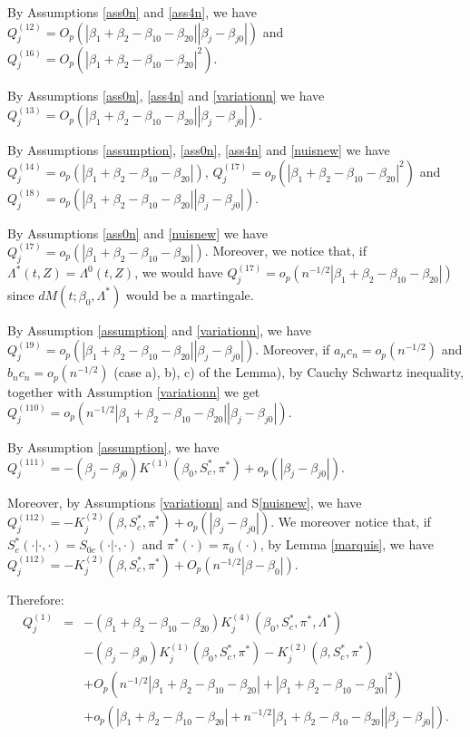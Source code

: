 \documentclass[11pt]{article}
\newcommand{\eqnn}{\begin{eqnarray*}}
\newcommand{\een}{\end{eqnarray*}}
\begin{document}
\begin{newproof7}
By Assumptions \ref{ass0n} and \ref{ass4n}, we have $Q^{(12)}_j=O_p\left(\left|\beta_1+\beta_2-\beta_{10}-\beta_{20}\right|\left|\beta_j-\beta_{j0}\right|\right)$ and $Q^{(16)}_j=O_p\left(\left|\beta_1+\beta_2-\beta_{10}-\beta_{20}\right|^2\right)$.

By Assumptions \ref{ass0n}, \ref{ass4n} and \ref{variationn} we have $Q^{(13)}_j=O_p\left(\left|\beta_1+\beta_2-\beta_{10}-\beta_{20}\right|\left|\beta_j-\beta_{j0}\right|\right)$.

By Assumptions \ref{assumption}, \ref{ass0n}, \ref{ass4n}  and  \eqref{nuisnew} we have $Q^{(14)}_j=o_p(\left|\beta_1+\beta_2-\beta_{10}-\beta_{20}\right|)$, $Q^{(17)}_j=o_p\left(\left|\beta_1+\beta_2-\beta_{10}-\beta_{20}\right|^2\right)$ and $Q^{(18)}_j=o_p\left(\left|\beta_1+\beta_2-\beta_{10}-\beta_{20}\right|\left|\beta_j-\beta_{j0}\right|\right)$.

By Assumptions \ref{ass0n} and \eqref{nuisnew} we have $Q^{(17)}_j=o_p\left(\left|\beta_1+\beta_2-\beta_{10}-\beta_{20}\right|\right)$. Moreover, we notice that, if $\Lambda^{*}(t,Z)=\Lambda^{0}(t,Z)$, we would have $Q^{(17)}_j=o_p\left(n^{-1/2}\left|\beta_1+\beta_2-\beta_{10}-\beta_{20}\right|\right)$ since $dM(t ; \beta_0, \Lambda^{*})$ would be a martingale.

By Assumption \ref{assumption} and \ref{variationn}, we have $Q^{(19)}_j=o_p\left(\left|\beta_1+\beta_2-\beta_{10}-\beta_{20}\right|\left|\beta_j-\beta_{j0}\right|\right)$.
Moreover, if $a_nc_n=o_p(n^{-1/2})$ and $b_nc_n=o_p(n^{-1/2})$ (case a), b), c) of the Lemma), by Cauchy Schwartz inequality, together with Assumption \ref{variationn} we get \\$Q^{(110)}_j=o_p\left(n^{-1/2}\left|\beta_1+\beta_2-\beta_{10}-\beta_{20}\right|\left|\beta_j-\beta_{j0}\right|\right)$.

By Assumption \ref{assumption}, we have $Q^{(111)}_j=-(\beta_j-\beta_{j0})K^{(1)}(\beta_0,S^{*}_c, \pi^{*})+o_p\left(\left|\beta_j-\beta_{j0}\right|\right)$.

Moreover, by Assumptions \ref{variationn} and S\eqref{nuisnew}, we have $Q^{(112)}_j=-K^{(2)}_j(\beta, S^{*}_c, \pi^{*})+o_p\left(\left|\beta_j-\beta_{j0}\right|\right)$. We moreover notice that, if $S^{*}_c(\cdot | \cdot,\cdot)=S_{0c}(\cdot | \cdot,\cdot)$ and $\pi^{*}(\cdot)=\pi_0(\cdot)$, by Lemma \ref{marquis}, we have $Q^{(112)}_j=-K^{(2)}_j(\beta, S^{*}_c, \pi^{*})+O_p\left(n^{-1/2}\left|\beta-\beta_{0}\right|\right)$.

Therefore:
\eqnn
Q^{(1)}_j&=&-(\beta_1+\beta_2-\beta_{10}-\beta_{20})K^{(4)}_j(\beta_0, S^{*}_c,\pi^{*}, \Lambda^{*})
\\&&-(\beta_j-\beta_{j0})K^{(1)}_j(\beta_0,S^{*}_c,\pi^{*})-K^{(2)}_j(\beta, S^{*}_c,\pi^{*})\\
&&+O_p\left(n^{-1/2}\left|\beta_1+\beta_2-\beta_{10}-\beta_{20}\right|+\left|\beta_1+\beta_2-\beta_{10}-\beta_{20}\right|^2\right)\\
&&+o_p(\left|\beta_1+\beta_2-\beta_{10}-\beta_{20}\right|+n^{-1/2}\left|\beta_1+\beta_2-\beta_{10}-\beta_{20}\right|\left|\beta_j-\beta_{j0}\right|).
\een


\end{newproof7}
\end{document}
